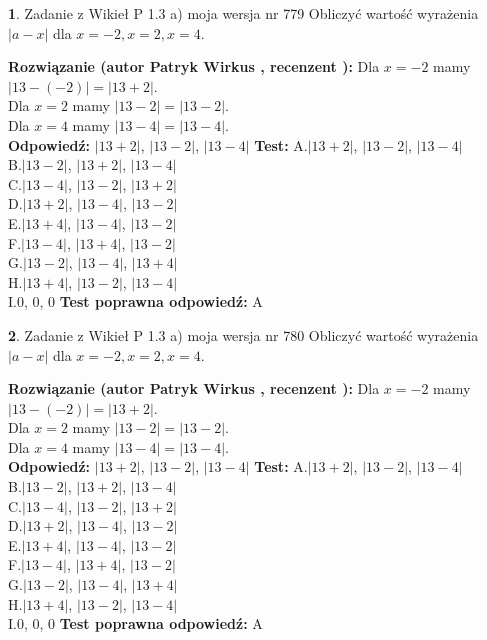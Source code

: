 \documentclass[12pt, a4paper]{article}
\theoremstyle{definition} %
\newtheorem{zad}{}
\newcommand{\zadStart}[1]{\begin{zad}#1\newline}
\newcommand{\zadStop}{\end{zad}}
\newcommand{\rozwStart}[2]{\noindent \textbf{Rozwiązanie (autor #1 , recenzent #2): }\newline}
\newcommand{\rozwStop}{\newline}
\newcommand{\odpStart}{\noindent \textbf{Odpowiedź:}\newline}
\newcommand{\odpStop}{\newline}
\newcommand{\testStart}{\noindent \textbf{Test:}\newline}
\newcommand{\testStop}{\newline}
\newcommand{\kluczStart}{\noindent \textbf{Test poprawna odpowiedź:}\newline}
\newcommand{\kluczStop}{\newline}
\begin{document}
\zadStart{Zadanie z Wikieł P 1.3 a) moja wersja nr 779}
Obliczyć wartość wyrażenia $|a - x|$ dla $x=-2,x=2,x=4$.
\zadStop
\rozwStart{Patryk Wirkus}{}
Dla $x = -2$ mamy $|13 - (-2)| = |13 + 2|$.\\
Dla $x = 2$ mamy $|13 - 2| = |13 - 2|$.\\
Dla $x = 4$ mamy $|13 - 4| = |13 - 4|$.\\
\rozwStop
\odpStart
$|13 + 2|$, $|13 - 2|$, $|13 - 4|$
\odpStop
\testStart
A.$|13 + 2|$, $|13 - 2|$, $|13 - 4|$\\
B.$|13 - 2|$, $|13 + 2|$, $|13 - 4|$\\
C.$|13 - 4|$, $|13 - 2|$, $|13 + 2|$\\
D.$|13 + 2|$, $|13 - 4|$, $|13 - 2|$\\
E.$|13 + 4|$, $|13 - 4|$, $|13 - 2|$\\
F.$|13 - 4|$, $|13 + 4|$, $|13 - 2|$\\
G.$|13 - 2|$, $|13 - 4|$, $|13 + 4|$\\
H.$|13 + 4|$, $|13 - 2|$, $|13 - 4|$\\
I.$0$, $0$, $0$
\testStop
\kluczStart
A
\kluczStop



\zadStart{Zadanie z Wikieł P 1.3 a) moja wersja nr 780}
Obliczyć wartość wyrażenia $|a - x|$ dla $x=-2,x=2,x=4$.
\zadStop
\rozwStart{Patryk Wirkus}{}
Dla $x = -2$ mamy $|13 - (-2)| = |13 + 2|$.\\
Dla $x = 2$ mamy $|13 - 2| = |13 - 2|$.\\
Dla $x = 4$ mamy $|13 - 4| = |13 - 4|$.\\
\rozwStop
\odpStart
$|13 + 2|$, $|13 - 2|$, $|13 - 4|$
\odpStop
\testStart
A.$|13 + 2|$, $|13 - 2|$, $|13 - 4|$\\
B.$|13 - 2|$, $|13 + 2|$, $|13 - 4|$\\
C.$|13 - 4|$, $|13 - 2|$, $|13 + 2|$\\
D.$|13 + 2|$, $|13 - 4|$, $|13 - 2|$\\
E.$|13 + 4|$, $|13 - 4|$, $|13 - 2|$\\
F.$|13 - 4|$, $|13 + 4|$, $|13 - 2|$\\
G.$|13 - 2|$, $|13 - 4|$, $|13 + 4|$\\
H.$|13 + 4|$, $|13 - 2|$, $|13 - 4|$\\
I.$0$, $0$, $0$
\testStop
\kluczStart
A
\kluczStop
\end{document}
